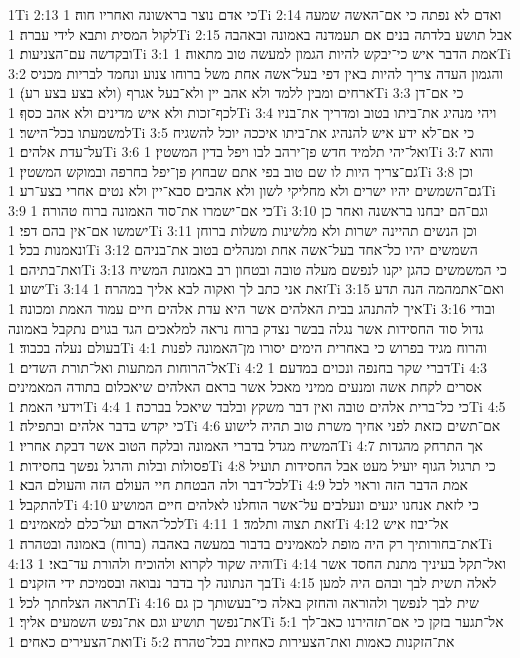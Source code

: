 1Ti 2:13  כי אדם נוצר בראשונה ואחריו חוה׃
1Ti 2:14  ואדם לא נפתה כי אם־האשה שמעה לקול המסית ותבא לידי עברה׃
1Ti 2:15  אבל תושע בלדתה בנים אם תעמדנה באמונה ובאהבה ובקדשה עם־הצניעות׃
1Ti 3:1  אמת הדבר איש כי־יבקש להיות הגמון למעשה טוב מתאוה׃
1Ti 3:2  והגמון העדה צריך להיות באין דפי בעל־אשה אחת משל ברוחו צנוע ונחמד לבריות מכניס ארחים ומבין ללמד ולא אהב יין ולא־בעל אגרף (ולא בצע בצע רע)׃
1Ti 3:3  כי אם־דן לכף־זכות ולא איש מדינים ולא אהב כסף׃
1Ti 3:4  ויהי מנהיג את־ביתו בטוב ומדריך את־בניו למשמעתו בכל־הישר׃
1Ti 3:5  כי אם־לא ידע איש להנהיג את־ביתו איככה יוכל להשגיח על־עדת אלהים׃
1Ti 3:6  ואל־יהי תלמיד חדש פן־ירהב לבו ויפל בדין המשטין׃
1Ti 3:7  והוא גם־צריך היות לו שם טוב בפי אתם שבחוץ פן־יפל בחרפה ובמוקש המשטין׃
1Ti 3:8  וכן גם־השמשים יהיו ישרים ולא מחליקי לשון ולא אהבים סבא־יין ולא נטים אחרי בצע־רע׃
1Ti 3:9  כי אם־ישמרו את־סוד האמונה ברוח טהורה׃
1Ti 3:10  וגם־הם יבחנו בראשנה ואחר כן ישמשו אם־אין בהם דפי׃
1Ti 3:11  וכן הנשים תהיינה ישרות ולא מלשינות משלות ברוחן ונאמנות בכל׃
1Ti 3:12  השמשים יהיו כל־אחד בעל־אשה אחת ומנהלים בטוב את־בניהם ואת־בתיהם׃
1Ti 3:13  כי המשמשים כהגן יקנו לנפשם מעלה טובה ובטחון רב באמונת המשיח ישוע׃
1Ti 3:14  זאת אני כתב לך ואקוה לבא אליך במהרה׃
1Ti 3:15  ואם־אתמהמה הנה תדע איך להתנהג בבית האלהים אשר היא עדת אלהים חיים עמוד האמת ומכונה׃
1Ti 3:16  ובודי גדול סוד החסידות אשר נגלה בבשר נצדק ברוח נראה למלאכים הגד בגוים נתקבל באמונה בעולם נעלה בכבוד׃
1Ti 4:1  והרוח מגיד בפרוש כי באחרית הימים יסורו מן־האמונה לפנות אל־הרוחות המתעות ואל־תורת השדים׃
1Ti 4:2  דברי שקר בחנפה ונכוים במדעם׃
1Ti 4:3  אסרים לקחת אשה ומנעים ממיני מאכל אשר בראם האלהים שיאכלום בתודה המאמינים וידעי האמת׃
1Ti 4:4  כי כל־ברית אלהים טובה ואין דבר משקץ ובלבד שיאכל בברכה׃
1Ti 4:5  כי יקדש בדבר אלהים ובתפילה׃
1Ti 4:6  אם־תשים כזאת לפני אחיך משרת טוב תהיה לישוע המשיח מגדל בדברי האמונה ובלקח הטוב אשר דבקת אחריו׃
1Ti 4:7  אך התרחק מהגדות פסולות ובלות והרגל נפשך בחסידות׃
1Ti 4:8  כי תרגול הגוף יועיל מעט אבל החסידות תועיל לכל־דבר ולה הבטחת חיי העולם הזה והעולם הבא׃
1Ti 4:9  אמת הדבר הזה וראוי לכל להתקבל׃
1Ti 4:10  כי לזאת אנחנו יגעים ונעלבים על־אשר הוחלנו לאלהים חיים המושיע לכל־האדם ועל־כלם למאמינים׃
1Ti 4:11  זאת תצוה ותלמד׃
1Ti 4:12  אל־יבוז איש את־בחורותיך רק היה מופת למאמינים בדבור במעשה באהבה (ברוח) באמונה ובטהרה׃
1Ti 4:13  והיה שקוד לקרוא ולהוכיח ולהורת עד־באי׃
1Ti 4:14  ואל־תקל בעיניך מתנת החסד אשר בך הנתונה לך בדבר נבואה ובסמיכת ידי הזקנים׃
1Ti 4:15  לאלה תשית לבך ובהם היה למען תראה הצלחתך לכל׃
1Ti 4:16  שית לבך לנפשך ולהוראה והחזק באלה כי־בעשותך כן גם את־נפשך תושיע וגם את־נפש השמעים אליך׃
1Ti 5:1  אל־תגער בזקן כי אם־תזהירנו כאב־לך ואת־הצעירים כאחים׃
1Ti 5:2  את־הזקנות כאמות ואת־הצעירות כאחיות בכל־טהרה׃
